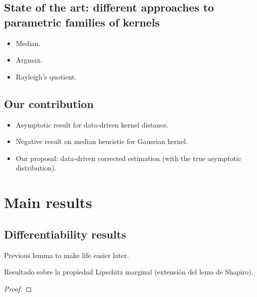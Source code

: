 	\subsection{State of the art: different approaches to parametric families of kernels}
		\begin{itemize}
			\item Median.
			\item Argmax.
			\item Rayleigh's quotient.
		\end{itemize}
	\subsection{Our contribution}
		\begin{itemize}
			\item Asymptotic result for data-driven kernel distance.
			\item Negative result on median heuristic for Gaussian kernel.
			\item Our proposal: data-driven corrected estimation (with the true asymptotic distribution).
		\end{itemize}
\section{Main results}
	\subsection{Differentiability results}
		{\color{orange} Previous lemma to make life easier later}.
		\begin{Lema}\label{Lema:PartialLipschitz}
			{\color{orange}Resultado sobre la propiedad Lipschitz marginal (extensi\'{o}n del lema de Shapiro).}
		\end{Lema}
		\begin{proof}
			
		\end{proof}
